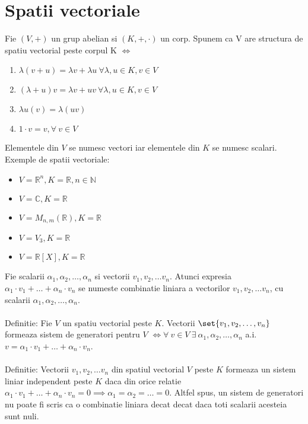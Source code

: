 \documentclass{article}
\begin{document}
        \section{Spatii vectoriale}
        Fie $(V, +)$ un grup abelian si $(K, +, \cdot)$ un corp. Spunem ca V are structura de spatiu vectorial peste corpul K $\iff$
        	\begin{enumerate}
        		\item $\lambda(v + u)= \lambda v + \lambda u\ \forall \lambda, u \in K, v \in V$
        		\item $(\lambda + u)v = \lambda  v + uv\ \forall \lambda, u \in K, v \in V$
        		\item $ \lambda u \left(v\right) = \lambda \left(uv\right)$
        		\item $1 \cdot v = v, \forall \ v \in V$
        	\end{enumerate}
        Elementele din $V$ se numesc vectori iar elementele din $K$ se numesc scalari.\\
        Exemple de spatii vectoriale:
        \begin{itemize}
        	\item $V = \mathbb{R}^{n}, K = \mathbb{R}, n \in \mathbb{N}$
        	\item $V = \mathbb{C}, K = \mathbb{R}$
        	\item $V = M_{n,m}(\mathbb{R}), K = \mathbb{R}$
        	\item $V = V_{3}, K = \mathbb{R}$
        	\item $V = \mathbb{R}[X], K = \mathbb{R}$
        \end{itemize}
        Fie scalarii $\alpha_{1}, \alpha_{2}, \dots, \alpha_{n}$ si vectorii $v_{1}, v_{2}, \dots v_{n}$. Atunci expresia $\alpha_{1} \cdot v_{1} + \dots + \alpha_{n} \cdot v_{n}$ se numeste combinatie liniara a vectorilor $v_{1}, v_{2}, \dots v_{n}$, cu scalarii $\alpha_{1}, \alpha_{2}, \dots, \alpha_{n}$. \\ \\
        Definitie: Fie $V$ un spatiu vectorial peste $K$. Vectorii $\set{ v_{1}, v_2, \dots, v_{n}}$ formeaza sistem de generatori pentru $V$ $\iff \forall\ v \in V\ \exists\ \alpha_{1}, \alpha_{2}, \dots , \alpha_{n}$ a.i. $v = \alpha_{1} \cdot v_{1} + \dots + \alpha_{n} \cdot v_{n}$. \\ \\
        Definitie: Vectorii $v_{1}, v_{2}, \dots v_{n}$ din spatiul vectorial $V$ peste $K$ formeaza un sistem liniar independent peste $K$ daca din orice relatie $\alpha_{1} \cdot v_{1} + \dots + \alpha_{n} \cdot v_{n} = 0 \implies \alpha_{1} = \alpha_{2} = \dots = 0$. Altfel spus, un sistem de generatori nu poate fi scris ca o combinatie liniara decat decat daca toti scalarii acesteia sunt nuli. \\ \\
\end{document}
